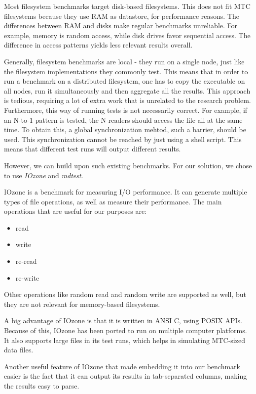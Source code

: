 Most filesystem benchmarks target disk-based filesystems. This does not fit MTC filesystems because they use RAM as datastore, for performance reasons. The differences between RAM and disks make regular benchmarks unreliable. For example, memory is random access, while disk drives favor sequential access. The difference in access patterns yields less relevant results overall.

Generally, filesystem benchmarks are local - they run on a single node, just like the filesystem implementations they commonly test. This means that in order to run a benchmark on a distributed filesystem, one has to copy the executable on all nodes, run it simultaneously and then aggregate all the results. This approach is tedious, requiring a lot of extra work that is unrelated to the research problem. Furthermore, this way of running tests is not necessarily correct. For example, if an N-to-1 pattern is tested, the N readers should access the file all at the same time. To obtain this, a global synchronization mehtod, such a barrier, should be used. This synchronization cannot be reached by just using a shell script. This means that different test runs will output different results.

However, we can build upon such existing benchmarks. For our solution, we chose to use \textit{IOzone}\cite{iozone} and \textit{mdtest}\cite{mdtest}.


IOzone is a benchmark for measuring I/O performance. It can generate multiple types of file operations, as well as measure their performance. The main operations that are useful for our purposes are:

\begin{itemize}
\item read
\item write
\item re-read
\item re-write
\end{itemize}

Other operations like random read and random write are supported as well, but they are not relevant for memory-based filesystems.

A big advantage of IOzone is that it is written in ANSI C, using POSIX APIs. Because of this, IOzone has been ported to run on multiple computer platforms. It also supports large files in its test runs, which helps in simulating MTC-sized data files.

Another useful feature of IOzone that made embedding it into our benchmark easier is the fact that it can output its results in tab-separated columns, making the results easy to parse.

